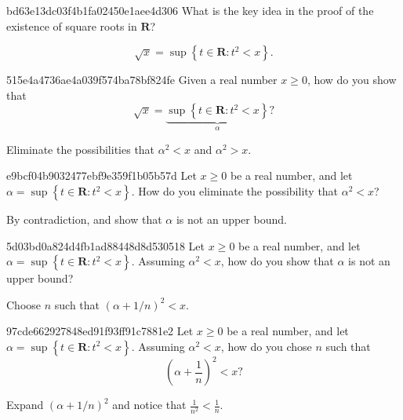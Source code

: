 \begin{note}{bd63e13dc03f4b1fa02450e1aee4d306}
    What is the key idea in the proof of the existence of square roots in \({ \mathbf{R} }\)?

    \begin{cloze}{1}
        \[
            \sqrt{x} = \sup \left\{ t \in \mathbf{R} : t^2 < x \right\}.
        \]
    \end{cloze}
\end{note}

\begin{note}{515e4a4736ae4a039f574ba78bf824fe}
    Given a real number \({ x \geq 0 }\), how do you show that
    \[
        \sqrt{x} = \underbrace{\sup \left\{ t \in \mathbf{R} : t^2 < x \right\}}_{\alpha}?
    \]

    \begin{cloze}{1}
        Eliminate the possibilities that \({ \alpha^2 < x }\) and \({ \alpha^2 > x }\).
    \end{cloze}
\end{note}

\begin{note}{e9bcf04b9032477ebf9e359f1b05b57d}
    Let \({ x \geq 0 }\) be a real number, and let \({ \alpha = \sup \left\{ t \in \mathbf{R} : t^2 < x \right\} }\).
    How do you eliminate the possibility that \({ \alpha^2 < x }\)?

    \begin{cloze}{1}
        By contradiction, and show that \({ \alpha }\) is not an upper bound.
    \end{cloze}
\end{note}

\begin{note}{5d03bd0a824d4fb1ad88448d8d530518}
    Let \({ x \geq 0 }\) be a real number, and let \({ \alpha = \sup \left\{ t \in \mathbf{R} : t^2 < x \right\} }\).
    Assuming \({ \alpha^2 < x }\), how do you show that \({ \alpha }\) is not an upper bound?

    \begin{cloze}{1}
        Choose \({ n }\) such that \({ \left( \alpha + 1/n \right)^2 < x }\).
    \end{cloze}
\end{note}

\begin{note}{97cde662927848ed91f93ff91c7881e2}
    Let \({ x \geq 0 }\) be a real number, and let \({ \alpha = \sup \left\{ t \in \mathbf{R} : t^2 < x \right\} }\).
    Assuming \({ \alpha^2 < x }\), how do you chose \({ n }\) such that
    \[
            \left( \alpha + \frac{1}{n} \right)^2 < x?
    \]

    \begin{cloze}{1}
        Expand \({ \left( \alpha + 1/n \right)^2 }\) and notice that \({ \frac{1}{n^2} < \frac{1}{n} }\).
    \end{cloze}
\end{note}

